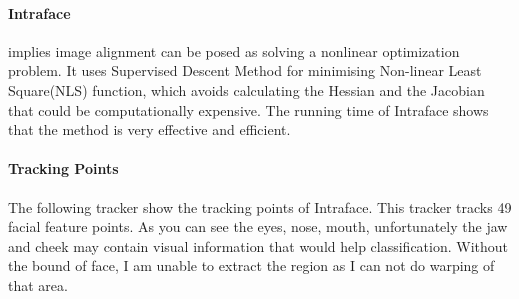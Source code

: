\paragraph{Intraface}
\cite{xiong2013supervised} implies image alignment  can be posed as solving a nonlinear optimization problem. It uses Supervised Descent Method for minimising Non-linear Least Square(NLS) function, which avoids calculating the Hessian and the Jacobian that could be computationally expensive. The running time of Intraface shows that the method is very effective and efficient.
\paragraph{Tracking Points}
The following tracker show the tracking points of Intraface. This tracker tracks 49 facial feature points. As you can see the eyes, nose, mouth, unfortunately the jaw and cheek may contain visual information that would help classification. Without the bound of face, I am unable to extract the region  as I can not do warping of that area.
